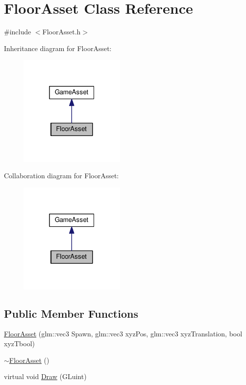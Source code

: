 \hypertarget{class_floor_asset}{}\section{Floor\+Asset Class Reference}
\label{class_floor_asset}


{\ttfamily \#include $<$Floor\+Asset.\+h$>$}



Inheritance diagram for Floor\+Asset\+:
\nopagebreak
\begin{figure}[H]
\begin{center}
\leavevmode
\includegraphics[width=148pt]{class_floor_asset__inherit__graph}
\end{center}
\end{figure}


Collaboration diagram for Floor\+Asset\+:
\nopagebreak
\begin{figure}[H]
\begin{center}
\leavevmode
\includegraphics[width=148pt]{class_floor_asset__coll__graph}
\end{center}
\end{figure}
\subsection*{Public Member Functions}
\begin{DoxyCompactItemize}
\item 
\hyperlink{class_floor_asset_a4b8e3fb6415ed1126c9243267c7195a8}{Floor\+Asset} (glm\+::vec3 Spawn, glm\+::vec3 xyz\+Pos, glm\+::vec3 xyz\+Translation, bool xyz\+Tbool)
\item 
\hyperlink{class_floor_asset_a7d782882bb08ee2a2285821275383856}{$\sim$\+Floor\+Asset} ()
\item 
virtual void \hyperlink{class_floor_asset_a14650eb2c2cd75e990c351bad8636279}{Draw} (G\+Luint)
\end{DoxyCompactItemize}


